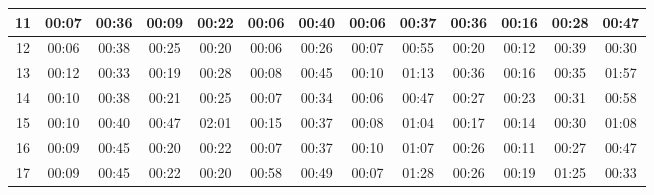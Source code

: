 \begin{center}
\begin{sideways}
\begin{tabular}{|l|l|l|l|l|l|l|l|l|l|l|l|l|}
\hline
\multicolumn{1}{|c|}{11} & 
\multicolumn{1}{c|}{00:07} & \multicolumn{1}{c|}{00:36} & \multicolumn{1}{c|}{00:09} & \multicolumn{1}{c|}{00:22} & \multicolumn{1}{c|}{00:06}	& \multicolumn{1}{c|}{00:40} & \multicolumn{1}{c|}{00:06} & \multicolumn{1}{c|}{00:37} & \multicolumn{1}{c|}{00:36} & \multicolumn{1}{c|}{00:16} & \multicolumn{1}{c|}{00:28} & \multicolumn{1}{c|}{00:47} \\ 
\hline
\multicolumn{1}{|c|}{12} & 
\multicolumn{1}{c|}{00:06} & \multicolumn{1}{c|}{00:38} & \multicolumn{1}{c|}{00:25} & \multicolumn{1}{c|}{00:20} & \multicolumn{1}{c|}{00:06}	& \multicolumn{1}{c|}{00:26} & \multicolumn{1}{c|}{00:07} & \multicolumn{1}{c|}{00:55} & \multicolumn{1}{c|}{00:20} & \multicolumn{1}{c|}{00:12} & \multicolumn{1}{c|}{00:39} & \multicolumn{1}{c|}{00:30} \\ 
\hline
\multicolumn{1}{|c|}{13} & 
\multicolumn{1}{c|}{00:12} & \multicolumn{1}{c|}{00:33} & \multicolumn{1}{c|}{00:19} & \multicolumn{1}{c|}{00:28} & \multicolumn{1}{c|}{00:08}	& \multicolumn{1}{c|}{00:45} & \multicolumn{1}{c|}{00:10} & \multicolumn{1}{c|}{01:13} & \multicolumn{1}{c|}{00:36} & \multicolumn{1}{c|}{00:16} & \multicolumn{1}{c|}{00:35} & \multicolumn{1}{c|}{01:57} \\ 
\hline
\multicolumn{1}{|c|}{14} & 
\multicolumn{1}{c|}{00:10} & \multicolumn{1}{c|}{00:38} & \multicolumn{1}{c|}{00:21} & \multicolumn{1}{c|}{00:25} & \multicolumn{1}{c|}{00:07}	& \multicolumn{1}{c|}{00:34} & \multicolumn{1}{c|}{00:06} & \multicolumn{1}{c|}{00:47} & \multicolumn{1}{c|}{00:27} & \multicolumn{1}{c|}{00:23} & \multicolumn{1}{c|}{00:31} & \multicolumn{1}{c|}{00:58} \\ 
\hline
\multicolumn{1}{|c|}{15} & 
\multicolumn{1}{c|}{00:10} & \multicolumn{1}{c|}{00:40} & \multicolumn{1}{c|}{00:47} & \multicolumn{1}{c|}{02:01} & \multicolumn{1}{c|}{00:15}	& \multicolumn{1}{c|}{00:37} & \multicolumn{1}{c|}{00:08} & \multicolumn{1}{c|}{01:04} & \multicolumn{1}{c|}{00:17} & \multicolumn{1}{c|}{00:14} & \multicolumn{1}{c|}{00:30} & \multicolumn{1}{c|}{01:08} \\ 
\hline
\multicolumn{1}{|c|}{16} & 
\multicolumn{1}{c|}{00:09} & \multicolumn{1}{c|}{00:45} & \multicolumn{1}{c|}{00:20} & \multicolumn{1}{c|}{00:22} & \multicolumn{1}{c|}{00:07}	& \multicolumn{1}{c|}{00:37} & \multicolumn{1}{c|}{00:10} & \multicolumn{1}{c|}{01:07} & \multicolumn{1}{c|}{00:26} & \multicolumn{1}{c|}{00:11} & \multicolumn{1}{c|}{00:27} & \multicolumn{1}{c|}{00:47} \\ 
\hline
\multicolumn{1}{|c|}{17} & 
\multicolumn{1}{c|}{00:09} & \multicolumn{1}{c|}{00:45} & \multicolumn{1}{c|}{00:22} & \multicolumn{1}{c|}{00:20} & \multicolumn{1}{c|}{00:58}	& \multicolumn{1}{c|}{00:49} & \multicolumn{1}{c|}{00:07} & \multicolumn{1}{c|}{01:28} & \multicolumn{1}{c|}{00:26} & \multicolumn{1}{c|}{00:19} & \multicolumn{1}{c|}{01:25} & \multicolumn{1}{c|}{00:33} \\ 

\end{tabular}
\end{sideways}
\end{center}
